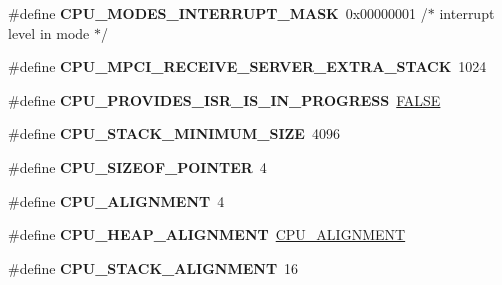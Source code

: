 \begin{DoxyCompactItemize}
\item 
\mbox{\label{group__RTEMSScoreCPUi386_gaf8823e651e33b9683e0d89e5a8054ee6}} 
\#define {\bfseries C\+P\+U\+\_\+\+M\+O\+D\+E\+S\+\_\+\+I\+N\+T\+E\+R\+R\+U\+P\+T\+\_\+\+M\+A\+SK}~0x00000001 /$\ast$ interrupt level in mode $\ast$/
\item 
\mbox{\label{group__RTEMSScoreCPUi386_gab94869be93a41da88a10fa59771ce2c9}} 
\#define {\bfseries C\+P\+U\+\_\+\+M\+P\+C\+I\+\_\+\+R\+E\+C\+E\+I\+V\+E\+\_\+\+S\+E\+R\+V\+E\+R\+\_\+\+E\+X\+T\+R\+A\+\_\+\+S\+T\+A\+CK}~1024
\item 
\mbox{\label{group__RTEMSScoreCPUi386_ga47f6e4d60c72b5f65fc775b0b5dd14ec}} 
\#define {\bfseries C\+P\+U\+\_\+\+P\+R\+O\+V\+I\+D\+E\+S\+\_\+\+I\+S\+R\+\_\+\+I\+S\+\_\+\+I\+N\+\_\+\+P\+R\+O\+G\+R\+E\+SS}~\mbox{\hyperlink{group__RTEMSScoreBaseDefs_gaa93f0eb578d23995850d61f7d61c55c1}{F\+A\+L\+SE}}
\item 
\mbox{\label{group__RTEMSScoreCPUi386_ga4c92ceea7549cc7b21db2c466916b733}} 
\#define {\bfseries C\+P\+U\+\_\+\+S\+T\+A\+C\+K\+\_\+\+M\+I\+N\+I\+M\+U\+M\+\_\+\+S\+I\+ZE}~4096
\item 
\mbox{\label{group__RTEMSScoreCPUi386_gaea4bd2905092d69bc92fbff6103ced8b}} 
\#define {\bfseries C\+P\+U\+\_\+\+S\+I\+Z\+E\+O\+F\+\_\+\+P\+O\+I\+N\+T\+ER}~4
\item 
\mbox{\label{group__RTEMSScoreCPUi386_gae526a309e32001688261048b19cdb7d8}} 
\#define {\bfseries C\+P\+U\+\_\+\+A\+L\+I\+G\+N\+M\+E\+NT}~4
\item 
\mbox{\label{group__RTEMSScoreCPUi386_gac71c1e0159c32144a04f18646ede252b}} 
\#define {\bfseries C\+P\+U\+\_\+\+H\+E\+A\+P\+\_\+\+A\+L\+I\+G\+N\+M\+E\+NT}~\mbox{\hyperlink{v850_2include_2rtems_2score_2cpu_8h_ae526a309e32001688261048b19cdb7d8}{C\+P\+U\+\_\+\+A\+L\+I\+G\+N\+M\+E\+NT}}
\item 
\mbox{\label{group__RTEMSScoreCPUi386_ga8aed43eb1b3c346772c127482b4b5372}} 
\#define {\bfseries C\+P\+U\+\_\+\+S\+T\+A\+C\+K\+\_\+\+A\+L\+I\+G\+N\+M\+E\+NT}~16

\end{DoxyCompactItemize}
